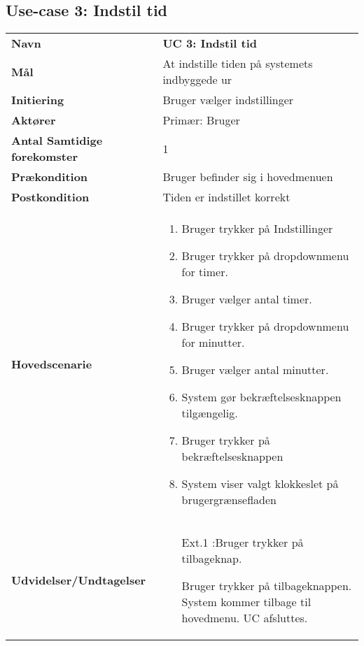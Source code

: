\subsection{Use-case 3: Indstil tid}
\begin{tabular}{>{\bfseries}p{100pt} p{300pt}}
	Navn & \bfseries{UC 3: Indstil tid} \\
		Mål & At indstille tiden på systemets indbyggede ur\\
	Initiering & Bruger vælger indstillinger \\
	Aktører & Primær: Bruger \\
	Antal Samtidige forekomster & 1 \\
	Prækondition & Bruger befinder sig i hovedmenuen \\
	Postkondition & Tiden er indstillet korrekt \\
	Hovedscenarie & \begin{enumerate}
		\item Bruger trykker på Indstillinger
		\item Bruger trykker på dropdownmenu for timer.
		\item Bruger vælger antal timer.
		\item Bruger trykker på dropdownmenu for minutter.
		\item Bruger vælger antal minutter.
		\item System gør bekræftelsesknappen tilgængelig.
		\item Bruger trykker på bekræftelsesknappen 
		\subitem [Ext. 1:Bruger trykker på tilbageknap.]
		\item System viser valgt klokkeslet på brugergrænsefladen
		
	\end{enumerate} \\
	Udvidelser/Undtagelser & 
	\begin{enumerate}{}{}
	\item[Ext.1]:Bruger trykker på tilbageknap.
	
		\subitem[1.1] Bruger trykker på tilbageknappen.
		\subitem[1.2] System kommer tilbage til hovedmenu.	 
		\subitem[1.3]UC afsluttes. \newline 
	\end{enumerate}
\end{tabular}